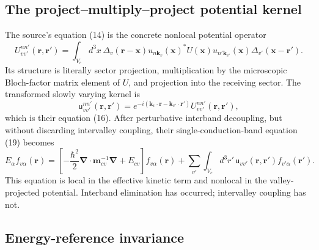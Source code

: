 \subsection{The project--multiply--project potential kernel}

The source's equation (14) is the concrete nonlocal potential operator
\begin{equation}
  U^{nn'}_{vv'}(\mathbf r,\mathbf r')
  =
  \int_{V_c}\!d^3x\,
  \Delta_v(\mathbf r-\mathbf x)
  u_{n\mathbf k_v}(\mathbf x)^{*}U(\mathbf x)
  u_{n'\mathbf k_{v'}}(\mathbf x)
  \Delta_{v'}(\mathbf x-\mathbf r').
  \label{eq:ermoneit-project-multiply-project}
\end{equation}
Its structure is literally sector projection, multiplication by the microscopic
Bloch-factor matrix element of $U$, and projection into the receiving sector.
The transformed slowly varying kernel is
\begin{equation}
  \mathsf u^{nn'}_{vv'}(\mathbf r,\mathbf r')
  =
  e^{-i(\mathbf k_v\cdot\mathbf r-
         \mathbf k_{v'}\cdot\mathbf r')}
  U^{nn'}_{vv'}(\mathbf r,\mathbf r'),
  \label{eq:ermoneit-slow-kernel}
\end{equation}
which is their equation (16). After perturbative interband decoupling, but
without discarding intervalley coupling, their single-conduction-band equation
(19) becomes
\begin{equation}
  E_\alpha f_{v\alpha}(\mathbf r)
  =
  \left[-\frac{\hbar^2}{2}
    \boldsymbol\nabla\mathbin{\cdot}\mathbf m_{cv}^{-1}
    \boldsymbol\nabla+E_{cv}\right]f_{v\alpha}(\mathbf r)
  +
  \sum_{v'}\int_{V_c}\!d^3r'\,
  \mathsf u_{vv'}(\mathbf r,\mathbf r')
  f_{v'\alpha}(\mathbf r').
  \label{eq:ermoneit-single-band-nonlocal}
\end{equation}
This equation is local in the effective kinetic term and nonlocal in the
valley-projected potential. Interband elimination has occurred; intervalley
coupling has not.

\subsection{Energy-reference invariance}

